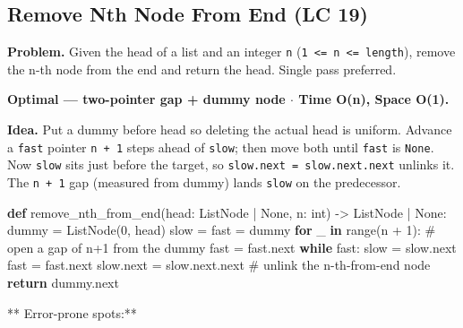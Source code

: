 \documentclass[11pt]{article}
\newenvironment{Shaded}{\begin{snugshade}}{\end{snugshade}}
\newcommand{\BuiltInTok}[1]{\textcolor[rgb]{0.50,0.55,0.55}{#1}}
\newcommand{\CommentTok}[1]{\textcolor[rgb]{0.48,0.49,0.49}{#1}}
\newcommand{\ControlFlowTok}[1]{\textcolor[rgb]{0.99,0.74,0.29}{\textbf{#1}}}
\newcommand{\DecValTok}[1]{\textcolor[rgb]{0.96,0.45,0.00}{#1}}
\newcommand{\KeywordTok}[1]{\textcolor[rgb]{0.81,0.81,0.76}{\textbf{#1}}}
\newcommand{\NormalTok}[1]{\textcolor[rgb]{0.81,0.81,0.76}{#1}}
\newcommand{\OperatorTok}[1]{\textcolor[rgb]{0.81,0.81,0.76}{#1}}
\newcommand{\VariableTok}[1]{\textcolor[rgb]{0.15,0.68,0.68}{#1}}
\begin{document}
\subsection{Remove Nth Node From End (LC 19)}\label{remove-nth-node-from-end-lc-19}

\textbf{Problem.} Given the head of a list and an integer \texttt{n} (\texttt{1\ \textless{}=\ n\ \textless{}=\ length}), remove the n-th node from the end and return the head. Single pass preferred.

\textbf{Optimal --- two-pointer gap + dummy node \(\cdot\) Time O(n), Space O(1).}

\textbf{Idea.} Put a dummy before head so deleting the actual head is uniform. Advance a \texttt{fast} pointer \texttt{n\ +\ 1} steps ahead of \texttt{slow}; then move both until \texttt{fast} is \texttt{None}. Now \texttt{slow} sits just before the target, so \texttt{slow.next\ =\ slow.next.next} unlinks it. The \texttt{n\ +\ 1} gap (measured from dummy) lands \texttt{slow} on the predecessor.


\begin{Shaded}
\begin{Highlighting}[]
\KeywordTok{def}\NormalTok{ remove\_nth\_from\_end(head: ListNode }\OperatorTok{|} \VariableTok{None}\NormalTok{, n: }\BuiltInTok{int}\NormalTok{) }\OperatorTok{{-}\textgreater{}}\NormalTok{ ListNode }\OperatorTok{|} \VariableTok{None}\NormalTok{:}
\NormalTok{    dummy }\OperatorTok{=}\NormalTok{ ListNode(}\DecValTok{0}\NormalTok{, head)}
\NormalTok{    slow }\OperatorTok{=}\NormalTok{ fast }\OperatorTok{=}\NormalTok{ dummy}
    \ControlFlowTok{for}\NormalTok{ \_ }\KeywordTok{in} \BuiltInTok{range}\NormalTok{(n }\OperatorTok{+} \DecValTok{1}\NormalTok{):    }\CommentTok{\# open a gap of n+1 from the dummy}
\NormalTok{        fast }\OperatorTok{=}\NormalTok{ fast.}\BuiltInTok{next}
    \ControlFlowTok{while}\NormalTok{ fast:}
\NormalTok{        slow }\OperatorTok{=}\NormalTok{ slow.}\BuiltInTok{next}
\NormalTok{        fast }\OperatorTok{=}\NormalTok{ fast.}\BuiltInTok{next}
\NormalTok{    slow.}\BuiltInTok{next} \OperatorTok{=}\NormalTok{ slow.}\BuiltInTok{next}\NormalTok{.}\BuiltInTok{next}  \CommentTok{\# unlink the n{-}th{-}from{-}end node}
    \ControlFlowTok{return}\NormalTok{ dummy.}\BuiltInTok{next}
\end{Highlighting}
\end{Shaded}

** Error-prone spots:**
\end{document}
